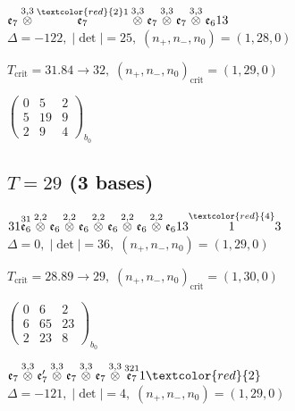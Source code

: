 \documentclass[10pt]{article}
\begin{document}
$\mathfrak{e}_7\overset{3,3}{\otimes}\overset{\textcolor{red}{2}1}{\mathfrak{e}_7}\overset{3,3}{\otimes}\mathfrak{e}_7\overset{3,3}{\otimes}\mathfrak{e}_7\overset{3,3}{\otimes}\mathfrak{e}_613$ \quad $\Delta=-122,\; |\det|=25,\; (n_+,n_-,n_0)=(1,28,0)$

\hspace{1em}$T_{\text{crit}}=31.84 \to 32,\; (n_+,n_-,n_0)_{\text{crit}}=(1,29,0)$

\hspace{2em}$\left(\begin{smallmatrix}0 & 5 & 2 \\ 5 & 19 & 9 \\ 2 & 9 & 4\end{smallmatrix}\right)_{\!b_0}$


\subsection*{$T = 29$ \quad (3 bases)}
\smallskip

$31\overset{31}{\mathfrak{e}_6}\overset{2,2}{\otimes}\mathfrak{e}_6\overset{2,2}{\otimes}\mathfrak{e}_6\overset{2,2}{\otimes}\mathfrak{e}_6\overset{2,2}{\otimes}\mathfrak{e}_6\overset{2,2}{\otimes}\mathfrak{e}_613\overset{\textcolor{red}{4}}{1}3$ \quad $\Delta=0,\; |\det|=36,\; (n_+,n_-,n_0)=(1,29,0)$

\hspace{1em}$T_{\text{crit}}=28.89 \to 29,\; (n_+,n_-,n_0)_{\text{crit}}=(1,30,0)$

\hspace{2em}$\left(\begin{smallmatrix}0 & 6 & 2 \\ 6 & 65 & 23 \\ 2 & 23 & 8\end{smallmatrix}\right)_{\!b_0}$

\smallskip

$\mathfrak{e}_7\overset{3,3}{\otimes}\mathfrak{e}_7'\overset{3,3}{\otimes}\mathfrak{e}_7\overset{3,3}{\otimes}\mathfrak{e}_7\overset{3,3}{\otimes}\overset{321}{\mathfrak{e}_7}1\textcolor{red}{2}$ \quad $\Delta=-121,\; |\det|=4,\; (n_+,n_-,n_0)=(1,29,0)$
\end{document}
